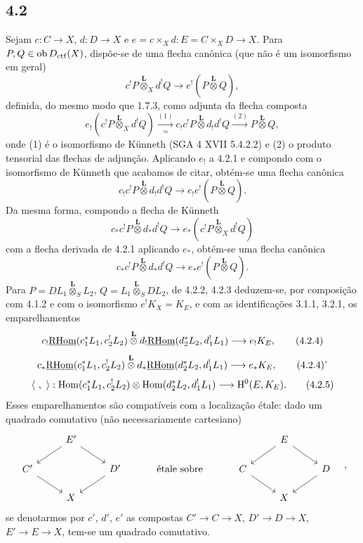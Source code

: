 \subsection*{4.2}
Sejam $c:C\to X$, $d:D\to X$ e $e=c\times_Xd:E=C\times_XD\to X$. Para $P,Q\in\operatorname{ob}D_{\mathrm{ctf}}(X)$, dispõe-se de uma flecha canônica (que não é um isomorfismo em geral)
\begin{equation}
c^!P\overset{\mathbf L}{\otimes}_X d^!Q
\longrightarrow e^!(P\overset{\mathbf L}{\otimes}Q),
\tag{4.2.1}
\end{equation}
definida, do mesmo modo que 1.7.3, como adjunta da flecha composta
\[
e_!(c^!P\overset{\mathbf L}{\otimes}_X d^!Q)
\xrightarrow[\simeq]{(1)}
 c_!c^!P\overset{\mathbf L}{\otimes}d_!d^!Q
\xrightarrow{(2)} P\overset{\mathbf L}{\otimes}Q,
\]
onde (1) é o isomorfismo de Künneth (SGA 4 XVII 5.4.2.2) e (2) o produto tensorial das flechas de adjunção. Aplicando $e_!$ a 4.2.1 e compondo com o isomorfismo de Künneth que acabamos de citar, obtém-se uma flecha canônica
\begin{equation}
c_!c^!P\overset{\mathbf L}{\otimes}d_!d^!Q
\longrightarrow e_!e^!(P\overset{\mathbf L}{\otimes}Q).
\tag{4.2.2}
\end{equation}
Da mesma forma, compondo a flecha de Künneth
\[
c_*c^!P\overset{\mathbf L}{\otimes}d_*d^!Q
\longrightarrow e_*(c^!P\overset{\mathbf L}{\otimes}_X d^!Q)
\]
com a flecha derivada de 4.2.1 aplicando $e_*$, obtém-se uma flecha canônica
\begin{equation}
c_*c^!P\overset{\mathbf L}{\otimes}d_*d^!Q
\longrightarrow e_*e^!(P\overset{\mathbf L}{\otimes}Q).
\tag{4.2.3}
\end{equation}
Para $P=DL_1\overset{\mathbf L}{\otimes}_S L_2$, $Q=L_1\overset{\mathbf L}{\otimes}_S DL_2$, de 4.2.2, 4.2.3 deduzem-se, por composição com 4.1.2 e com o isomorfismo $e^!K_X=K_E$, e com as identificações 3.1.1, 3.2.1, os emparelhamentos
\begin{equation}
c_!\underline{\mathrm{RHom}}(c_1^*L_1,c_2^!L_2)\overset{\mathbf L}{\otimes}
 d_!\underline{\mathrm{RHom}}(d_2^*L_2,d_1^!L_1)
\longrightarrow e_!K_E,
\tag{4.2.4}
\end{equation}
\begin{equation}
c_*\underline{\mathrm{RHom}}(c_1^*L_1,c_2^!L_2)\overset{\mathbf L}{\otimes}
 d_*\underline{\mathrm{RHom}}(d_2^*L_2,d_1^!L_1)
\longrightarrow e_*K_E,
\tag*{(4.2.4)'}
\end{equation}
\begin{equation}
\langle\ ,\ \rangle:
\Hom(c_1^*L_1,c_2^!L_2)\otimes\Hom(d_2^*L_2,d_1^!L_1)
\longrightarrow \H^0(E,K_E).
\tag{4.2.5}
\end{equation}
Esses emparelhamentos são compatíveis com a localização étale: dado um quadrado comutativo (não necessariamente cartesiano)
\[
\begin{tikzcd}[column sep=2.5em,row sep=1.5em]
& E' \arrow[dl] \arrow[dr] & && & E \arrow[dl] \arrow[dr] & \\
C' \arrow[dr] && D' \arrow[dl] & \text{ étale sobre } & C \arrow[dr] && D \arrow[dl] \\
& X &&&& X &
\end{tikzcd}\quad ,
\]
se denotarmos por $c'$, $d'$, $e'$ as compostas $C'\to C\to X$, $D'\to D\to X$, $E'\to E\to X$, tem-se um quadrado comutativo.


